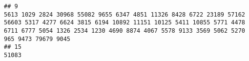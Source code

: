 \documentclass{article}\usepackage[]{graphicx}\usepackage[]{color}
\makeatletter
\newenvironment{kframe}{%
 \def\at@end@of@kframe{}%
 \ifinner\ifhmode%
  \def\at@end@of@kframe{\end{minipage}}%
  \begin{minipage}{\columnwidth}%
 \fi\fi%
 \def\FrameCommand##1{\hskip\@totalleftmargin \hskip-\fboxsep
 \colorbox{shadecolor}{##1}\hskip-\fboxsep
     \hskip-\linewidth \hskip-\@totalleftmargin \hskip\columnwidth}%
 \MakeFramed {\advance\hsize-\width
   \@totalleftmargin\z@ \linewidth\hsize
   \@setminipage}}%
 {\par\unskip\endMakeFramed%
 \at@end@of@kframe}
\newenvironment{knitrout}{}{} %
\makeatother
\begin{document}
\begin{knitrout}
\begin{kframe}
\begin{verbatim}
## 9                                                                                                                                                                                                                                                                                                                                                                                                                                                                                                                                                                                                                                                                                                                                                                                                                                                                                                                                                                                                                                                                                                                                                                                                                         5613 1029 2824 30968 55082 9655 6347 4851 11326 8428 6722 23189 57162 56603 5317 4277 6624 3815 6194 10892 11151 10125 5411 10855 5771 4478 6711 6777 5054 1326 2534 1230 4690 8874 4067 5578 9133 3569 5062 5270 965 9473 79679 9045
## 15                                                                                                                                                                                                                                                                                                                                                                                                                                                                                                                                                                                                                                                                                                                                                                                                                                                                                                                                                                                                                                                                                                                                                                                                                                                                                                                                                                                                                                                        51083

\end{verbatim}
\end{kframe}
\end{knitrout}
\end{document}

